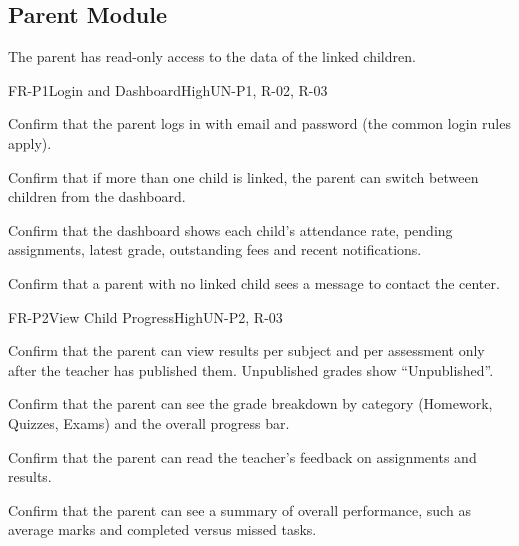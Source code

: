\subsection{Parent Module}
The parent has read-only access to the data of the linked children.

\begin{userstory}{FR-P1}{Login and Dashboard}{High}{UN-P1, R-02, R-03}
  \begin{confirmation}
    \item Confirm that the parent logs in with email and password (the common login rules apply).
    \item Confirm that if more than one child is linked, the parent can switch between children from the dashboard.
    \item Confirm that the dashboard shows each child's attendance rate, pending assignments, latest grade, outstanding fees and recent notifications.
    \item Confirm that a parent with no linked child sees a message to contact the center.
  \end{confirmation}
\end{userstory}

\begin{userstory}{FR-P2}{View Child Progress}{High}{UN-P2, R-03}
  \begin{confirmation}
    \item Confirm that the parent can view results per subject and per assessment only after the teacher has published them. Unpublished grades show ``Unpublished''.
    \item Confirm that the parent can see the grade breakdown by category (Homework, Quizzes, Exams) and the overall progress bar.
    \item Confirm that the parent can read the teacher's feedback on assignments and results.
    \item Confirm that the parent can see a summary of overall performance, such as average marks and completed versus missed tasks.
  \end{confirmation}
\end{userstory}

